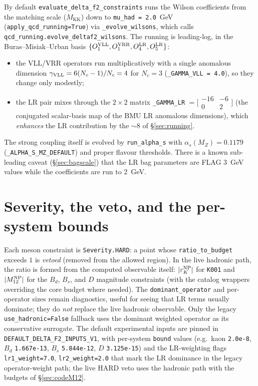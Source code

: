 \documentclass[11pt]{article}
\newcommand{\MKK}{M_{\mathrm{KK}}}
\newcommand{\Mtwelve}{M_{12}}
\newcommand{\Nc}{N_c}
\newcommand{\code}[1]{\texttt{#1}}
\theoremstyle{definition}
\begin{document}
By default \code{evaluate\_delta\_f2\_constraints} runs the Wilson coefficients
from the matching scale ($\MKK$) down to \code{mu\_had = 2.0}~GeV
(\code{apply\_qcd\_running=True}) via \code{\_evolve\_wilsons}, which calls
\code{qcd\_running.evolve\_deltaf2\_wilsons}. The running is leading-log, in the
Buras--Misiak--Urban basis $\{O_1^{\rm VLL}, O_1^{\rm VRR}, O_4^{\rm LR},
O_5^{\rm LR}\}$:
\begin{itemize}[leftmargin=1.4em]
\item the VLL/VRR operators run multiplicatively with a single anomalous dimension
$\gamma_{\rm VLL}=6(\Nc-1)/\Nc=4$ for $\Nc=3$ (\code{\_GAMMA\_VLL = 4.0}), so they
change only modestly;
\item the LR pair mixes through the $2\times2$ matrix \code{\_GAMMA\_LR}
$=\big[\!\begin{smallmatrix}-16 & -6\\ 0 & 2\end{smallmatrix}\!\big]$ (the
conjugated scalar-basis map of the BMU LR anomalous dimensions), which
\emph{enhances} the LR contribution by the $\sim8$ of \S\ref{sec:running}.
\end{itemize}
The strong coupling itself is evolved by \code{run\_alpha\_s} with
$\alpha_s(M_Z)=0.1179$ (\code{\_ALPHA\_S\_MZ\_DEFAULT}) and proper flavour
thresholds. There is a known sub-leading caveat (\S\ref{sec:bagscale}) that the LR
bag parameters are FLAG $3$~GeV values while the coefficients are run to $2$~GeV.

\section{Severity, the veto, and the per-system bounds}
\label{sec:codeVeto}

Each meson constraint is \code{Severity.HARD}: a point whose
\code{ratio\_to\_budget} exceeds $1$ is \emph{vetoed} (removed from the allowed
region). In the live hadronic path, the ratio is formed from the computed
observable itself: $|\varepsilon_K^{\rm NP}|$ for \code{K001} and
$|\Mtwelve^{\rm NP}|$ for the $B_d$, $B_s$, and $D$ magnitude constraints (with
the catalog wrappers overriding the core budget where needed). The
\code{dominant\_operator} and per-operator sizes remain diagnostics, useful for
seeing that LR terms usually dominate; they do \emph{not} replace the live
hadronic observable. Only the legacy \code{use\_hadronic=False} fallback uses the
dominant weighted operator as its conservative surrogate. The default experimental
inputs are pinned in \code{DEFAULT\_DELTA\_F2\_INPUTS\_V1}, with per-system
\code{bound} values (e.g.\ kaon \code{2.0e-8}, $B_d$ \code{1.667e-13}, $B_s$
\code{5.844e-12}, $D$ \code{3.125e-15}) and the LR-weighting flags
\code{lr1\_weight=7.0}, \code{lr2\_weight=2.0} that mark the LR dominance in the
legacy operator-weight path; the live HARD veto uses the hadronic path with the
budgets of \S\ref{sec:codeM12}.
\end{document}
